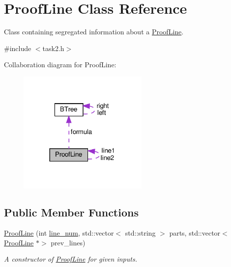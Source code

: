 \hypertarget{classProofLine}{}\section{Proof\+Line Class Reference}
\label{classProofLine}


Class containing segregated information about a \mbox{\hyperlink{classProofLine}{Proof\+Line}}.  




{\ttfamily \#include $<$task2.\+h$>$}



Collaboration diagram for Proof\+Line\+:\nopagebreak
\begin{figure}[H]
\begin{center}
\leavevmode
\includegraphics[width=180pt]{classProofLine__coll__graph}
\end{center}
\end{figure}
\subsection*{Public Member Functions}
\begin{DoxyCompactItemize}
\item 
\mbox{\hyperlink{classProofLine_a917582971a502aa8fc114467185c08b8}{Proof\+Line}} (int \mbox{\hyperlink{classProofLine_af1e2b73ad5275235028a4b131e574aa7}{line\+\_\+num}}, std\+::vector$<$ std\+::string $>$ parts, std\+::vector$<$ \mbox{\hyperlink{classProofLine}{Proof\+Line}} $\ast$$>$ prev\+\_\+lines)
\begin{DoxyCompactList}\small\item\em A constructor of \mbox{\hyperlink{classProofLine}{Proof\+Line}} for given inputs. \end{DoxyCompactList}\end{DoxyCompactItemize}
